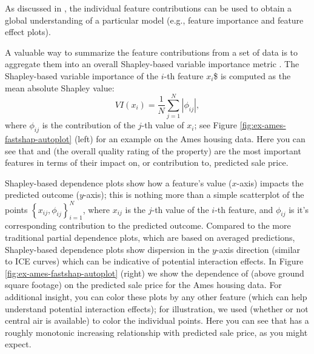 As discussed in \citet{lundberg-2020-treeshap}, the individual feature
contributions can be used to obtain a global understanding of a
particular model (e.g., feature importance and feature effect plots).

A valuable way to summarize the feature contributions from a set of data
is to aggregate them into an overall Shapley-based variable importance
metric \citep{lundberg-2020-treeshap}. The Shapley-based variable
importance of the \(i\)-th feature \(x_i\)\$ is computed as the mean
absolute Shapley value: \begin{equation}
\nonumber
  VI\left(x_i\right) = \frac{1}{N}\sum_{j = 1}^N \left\lvert\phi_{ij}\right\rvert,
\end{equation} where \(\phi_{ij}\) is the contribution of the \(j\)-th
value of \(x_i\); see Figure \ref{fig:ex-ames-fastshap-autoplot} (left)
for an example on the Ames housing data. Here you can see that
 and  (the overall quality
rating of the property) are the most important features in terms of
their impact on, or contribution to, predicted sale price.

Shapley-based dependence plots \citep{lundberg-2020-treeshap} show how a
feature's value (\(x\)-axis) impacts the predicted outcome (\(y\)-axis);
this is nothing more than a simple scatterplot of the points
\(\left\{x_{ij}, \phi_{ij}\right\}_{i = 1}^N\), where \(x_{ij}\) is the
\(j\)-th value of the \(i\)-th feature, and \(\phi_{ij}\) is it's
corresponding contribution to the predicted outcome. Compared to the
more traditional partial dependence plots, which are based on averaged
predictions, Shapley-based dependence plots show dispersion in the
\(y\)-axis direction (similar to ICE curves) which can be indicative of
potential interaction effects. In Figure
\ref{fig:ex-ames-fastshap-autoplot} (right) we show the dependence of
 (above ground square footage) on the predicted sale
price for the Ames housing data. For additional insight, you can color
these plots by any other feature (which can help understand potential
interaction effects); for illustration, we used 
(whether or not central air is available) to color the individual
points. Here you can see that  has a roughly
monotonic increasing relationship with predicted sale price, as you
might expect.

